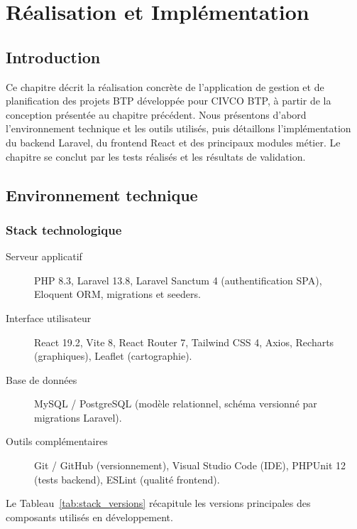 \chapter{Réalisation et Implémentation}
\label{chap:realisation}

\section{Introduction}

Ce chapitre décrit la réalisation concrète de l'application de gestion et de planification
des projets BTP développée pour CIVCO BTP, à partir de la conception présentée au
chapitre précédent. Nous présentons d'abord l'environnement technique et les outils
utilisés, puis détaillons l'implémentation du backend Laravel, du frontend React et
des principaux modules métier. Le chapitre se conclut par les tests réalisés et les
résultats de validation.

\section{Environnement technique}

\subsection{Stack technologique}

\begin{description}
  \item[Serveur applicatif] PHP 8.3, Laravel 13.8, Laravel Sanctum 4
  (authentification SPA), Eloquent ORM, migrations et seeders.
  \item[Interface utilisateur] React 19.2, Vite 8, React Router 7, Tailwind CSS 4, Axios,
  Recharts (graphiques), Leaflet (cartographie).
  \item[Base de données] MySQL / PostgreSQL (modèle relationnel,
  schéma versionné par migrations Laravel).
  \item[Outils complémentaires] Git / GitHub (versionnement), Visual Studio Code (IDE),
  PHPUnit 12 (tests backend), ESLint (qualité frontend).
\end{description}

Le Tableau~\ref{tab:stack_versions} récapitule les versions principales des composants
utilisés en développement.

